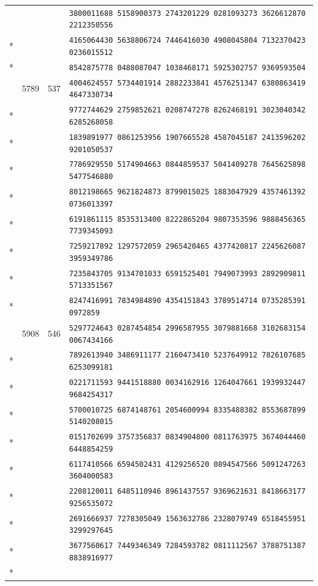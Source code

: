 \documentclass[10pt]{article}
\begin{document}
\begin{longtable}{@{}r@{\quad}r@{\quad}r@{\quad}l@{}}
 & &  & \texttt{3800011688 5158900373 2743201229 0281093273 3626612870 2212350556}\\*
 & &  & \texttt{4165064430 5638806724 7446416030 4908045804 7132370423 0236015512}\\*
 & &  & \texttt{8542875778 0488087047 1038468171 5925302757 9369593504}\\
\addlinespace[2pt]
98 & 5789 & 537 & \texttt{4004624557 5734401914 2882233841 4576251347 6380863419 4647330734}\\*
 & &  & \texttt{9772744629 2759852621 0208747278 8262468191 3023040342 6285268058}\\*
 & &  & \texttt{1839891977 0861253956 1907665528 4587045187 2413596202 9201050537}\\*
 & &  & \texttt{7786929550 5174904663 0844859537 5041409278 7645625898 5477546880}\\*
 & &  & \texttt{8012198665 9621824873 8799015025 1883047929 4357461392 0736013397}\\*
 & &  & \texttt{6191861115 8535313400 8222865204 9807353596 9888456365 7739345093}\\*
 & &  & \texttt{7259217892 1297572059 2965420465 4377420817 2245626087 3959349786}\\*
 & &  & \texttt{7235843705 9134701033 6591525401 7949073993 2892909811 5713351567}\\*
 & &  & \texttt{8247416991 7834984890 4354151843 3789514714 0735285391 0972859}\\
\addlinespace[2pt]
99 & 5908 & 546 & \texttt{5297724643 0287454854 2996587955 3079881668 3102683154 0067434166}\\*
 & &  & \texttt{7892613940 3486911177 2160473410 5237649912 7826107685 6253099181}\\*
 & &  & \texttt{0221711593 9441518880 0034162916 1264047661 1939932447 9684254317}\\*
 & &  & \texttt{5700010725 6874148761 2054600994 8335488382 8553687899 5140208015}\\*
 & &  & \texttt{0151702699 3757356837 0834904800 0811763975 3674044460 6448854259}\\*
 & &  & \texttt{6117410566 6594502431 4129256520 0894547566 5091247263 3604000583}\\*
 & &  & \texttt{2208120011 6485110946 8961437557 9369621631 8418663177 9256535072}\\*
 & &  & \texttt{2691666937 7278305049 1563632786 2328079749 6518455951 3299297645}\\*
 & &  & \texttt{3677560617 7449346349 7284593782 0811112567 3788751387 8838916977}\\*

\end{longtable}
\end{document}
